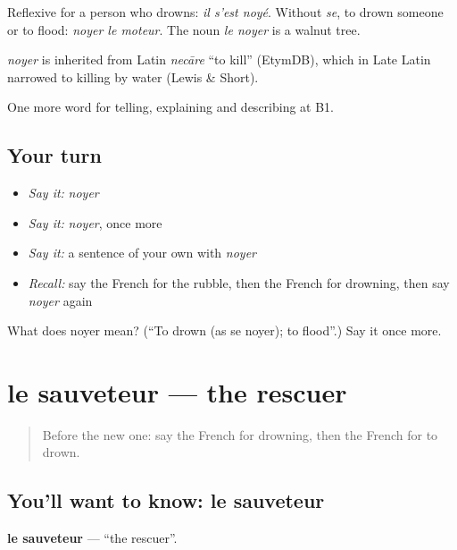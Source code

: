 Reflexive for a person who drowns: \emph{il s'est noyé}. Without \emph{se}, to drown someone or to flood: \emph{noyer le moteur}. The noun \emph{le noyer} is a walnut tree.

\begin{cousinweb}
\emph{noyer} is inherited from Latin \emph{necāre} \textquotedblleft{}to kill\textquotedblright{} (EtymDB), which in Late Latin narrowed to killing by water (Lewis \& Short).
\end{cousinweb}

\begin{grammarlens}[title={What you've built}]
One more word for telling, explaining and describing at B1.
\end{grammarlens}

\subsection*{Your turn}
\begin{itemize}
\raggedright
  \item \emph{Say it:} \emph{noyer}
  \item \emph{Say it:} \emph{noyer}, once more
  \item \emph{Say it:} a sentence of your own with \emph{noyer}
  \item \emph{Recall:} say the French for the rubble, then the French for drowning, then say \emph{noyer} again
\end{itemize}

\begin{tcolorbox}[breakable,colback=teal!4,colframe=teal!35!black,title={Before you move on}]
What does noyer mean? (\textquotedblleft{}To drown (as se noyer); to flood\textquotedblright{}.) Say it once more.
\end{tcolorbox}
\section[le sauveteur]{le sauveteur — the rescuer}

\label{lesson:FR-C304-sauveteur}



\begin{quote}
Before the new one: say the French for drowning, then the French for to drown.
\end{quote}

\subsection*{You'll want to know: le sauveteur}
\textbf{le sauveteur} — \textquotedblleft{}the rescuer\textquotedblright{}.

